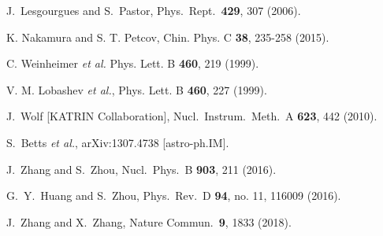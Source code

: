 \documentclass[aps,prd,nofootinbib,amsmath,amssymb,twocolumn,superscriptaddress,10pt]{revtex4}%
\begin{document}
\begin{thebibliography}{}

  J.~Lesgourgues and S.~Pastor,
  Phys.\ Rept.\  {\bf 429}, 307 (2006).

K. Nakamura and S. T. Petcov, Chin. Phys. C {\bf 38}, 235-258 (2015).


C. Weinheimer {\it et al.} Phys. Lett. B {\bf 460}, 219 (1999).

V. M. Lobashev {\it et al.}, Phys. Lett. B {\bf 460}, 227 (1999).

  J.~Wolf [KATRIN Collaboration],
  Nucl.\ Instrum.\ Meth.\ A {\bf 623}, 442 (2010).

  S.~Betts {\it et al.},
  arXiv:1307.4738 [astro-ph.IM].

  J.~Zhang and S.~Zhou,
  Nucl.\ Phys.\ B {\bf 903}, 211 (2016).

  G.~Y.~Huang and S.~Zhou,
  Phys.\ Rev.\ D {\bf 94}, no. 11, 116009 (2016).

  J.~Zhang and X.~Zhang,
  Nature Commun.\  {\bf 9}, 1833 (2018).


\end{thebibliography}
\end{document}
